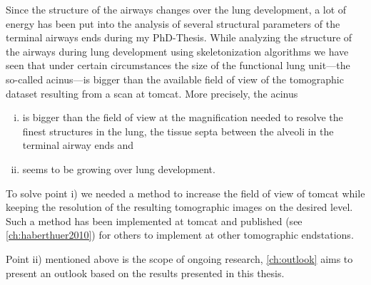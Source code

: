 Since the structure of the airways changes over the lung development\cite{Burri1974}, a lot of energy has been put into the analysis of several structural parameters of the terminal airways ends during my PhD-Thesis. While analyzing the structure of the airways during lung development using skeletonization algorithms we have seen that under certain circumstances the size of the functional lung unit---the so-called acinus---is bigger than the available field of view of the tomographic dataset resulting from a scan at \ac{tomcat}. More precisely, the acinus 
\begin{enumerate}[i)]
	\item is bigger than the field of view at the magnification needed to resolve the finest structures in the lung, the tissue septa between the alveoli in the terminal airway ends and
	\item seems to be growing over lung development.
\end{enumerate}

To solve point i) we needed a method to increase the field of view of \ac{tomcat} while keeping the resolution of the resulting tomographic images on the desired level. Such a method has been implemented at \ac{tomcat} and published (see \autoref{ch:haberthuer2010}) for others to implement at other tomographic endstations.

Point ii) mentioned above is the scope of ongoing research, \autoref{ch:outlook} aims to present an outlook based on the results presented in this thesis. 

